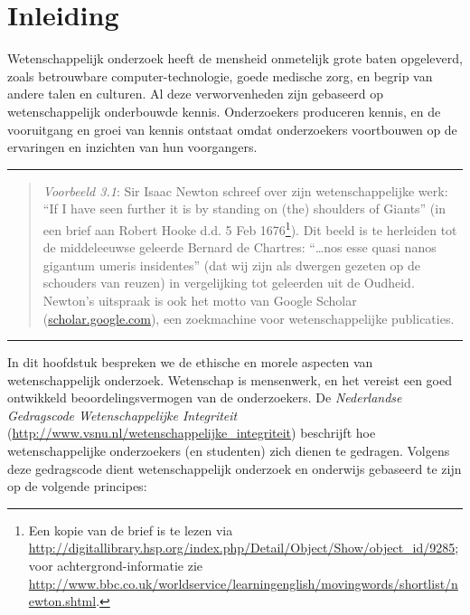 \documentclass[
]{book}
\begin{document}
\section{Inleiding}\label{sec:integriteit-inleiding}

Wetenschappelijk onderzoek heeft de mensheid onmetelijk grote baten
opgeleverd, zoals betrouwbare computer-technologie, goede medische zorg,
en begrip van andere talen en culturen. Al deze verworvenheden zijn
gebaseerd op wetenschappelijk onderbouwde kennis. Onderzoekers
produceren kennis, en de vooruitgang en groei van kennis ontstaat omdat
onderzoekers voortbouwen op de ervaringen en inzichten van hun
voorgangers.

\begin{center}\rule{0.5\linewidth}{0.5pt}\end{center}

\begin{quote}
\emph{Voorbeeld 3.1}: Sir Isaac Newton schreef over zijn
wetenschappelijke werk: ``If I have seen further it is by standing on (the)
shoulders of Giants'' (in een brief aan Robert Hooke d.d. 5 Feb
1676\footnote{Een kopie van de brief is te lezen via \url{http://digitallibrary.hsp.org/index.php/Detail/Object/Show/object_id/9285}; voor achtergrond-informatie zie \url{http://www.bbc.co.uk/worldservice/learningenglish/movingwords/shortlist/newton.shtml}.}). Dit beeld is te herleiden tot de middeleeuwse geleerde
Bernard de Chartres: ``\ldots nos esse quasi nanos gigantum umeris
insidentes'' (dat wij zijn als dwergen gezeten op de schouders van
reuzen) in vergelijking tot geleerden uit de Oudheid. Newton's
uitspraak is ook het motto van Google Scholar
(\url{scholar.google.com}), een zoekmachine voor
wetenschappelijke publicaties.
\end{quote}

\begin{center}\rule{0.5\linewidth}{0.5pt}\end{center}

In dit hoofdstuk bespreken we de ethische en morele aspecten van
wetenschappelijk onderzoek. Wetenschap is mensenwerk, en het vereist een
goed ontwikkeld beoordelingsvermogen van de onderzoekers. De
\emph{Nederlandse Gedragscode Wetenschappelijke Integriteit} \citep{VSNU18}
(\url{http://www.vsnu.nl/wetenschappelijke_integriteit}) beschrijft hoe
wetenschappelijke onderzoekers (en studenten) zich dienen te gedragen.
Volgens deze gedragscode dient wetenschappelijk onderzoek en onderwijs
gebaseerd te zijn op de volgende principes:
\end{document}
